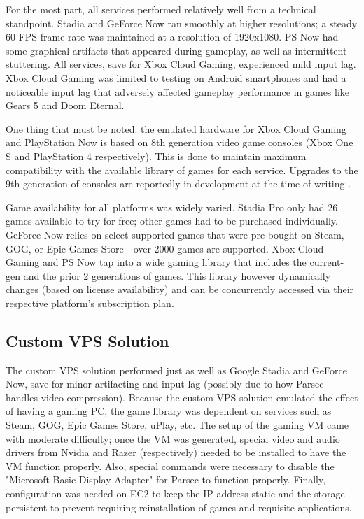 \documentclass[titlepage, 12pt]{article}
\begin{document}
For the most part, all services performed relatively well from a technical standpoint. Stadia and GeForce Now ran smoothly at higher resolutions; a steady 60 FPS frame rate was maintained at a resolution of 1920x1080. PS Now had some graphical artifacts that appeared during gameplay, as well as intermittent stuttering. All services, save for Xbox Cloud Gaming, experienced mild input lag. Xbox Cloud Gaming was limited to testing on Android smartphones and had a noticeable input lag that adversely affected gameplay performance in games like Gears 5 and Doom Eternal.

One thing that must be noted: the emulated hardware for Xbox Cloud Gaming and PlayStation Now is based on 8th generation video game consoles (Xbox One S and PlayStation 4 respectively). This is done to maintain maximum compatibility with the available library of games for each service. Upgrades to the 9th generation of consoles are reportedly in development at the time of writing \citep{vg247}.

Game availability for all platforms was widely varied. Stadia Pro only had 26 games available to try for free; other games had to be purchased individually. GeForce Now relies on select supported games that were pre-bought on Steam, GOG, or Epic Games Store - over 2000 games are supported. Xbox Cloud Gaming and PS Now tap into a wide gaming library that includes the current-gen and the prior 2 generations of games. This library however dynamically changes (based on license availability) and can be concurrently accessed via their respective platform's subscription plan.

	\subsection{Custom VPS Solution}
	
	The custom VPS solution performed just as well as Google Stadia and GeForce Now, save for minor artifacting and input lag (possibly due to how Parsec handles video compression). Because the custom VPS solution emulated the effect of having a gaming PC, the game library was dependent on services such as Steam, GOG, Epic Games Store, uPlay, etc. The setup of the gaming VM came with moderate difficulty; once the VM was generated, special video and audio drivers from Nvidia and Razer (respectively) needed to be installed to have the VM function properly. Also, special commands were necessary to disable the "Microsoft Basic Display Adapter" for Parsec to function properly. Finally, configuration was needed on EC2 to keep the IP address static and the storage persistent to prevent requiring reinstallation of games and requisite applications.
\end{document}
